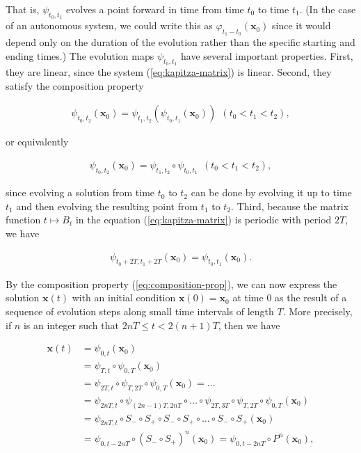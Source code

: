 \documentclass[11pt]{report}
\theoremstyle{plain}
\theoremstyle{definition}
\begin{document}
That is, $\psi_{t_0,t_1}$ evolves a point forward in
time from time $t_0$ to time $t_1$. (In the case of
an autonomous system, we could write this as
$\varphi_{t_1-t_0}(\mathbf{x}_0)$ since it would
depend only on the duration of the evolution rather
than the specific starting and ending times.) The
evolution maps $\psi_{t_0,t_1}$ have several
important properties. First, they are linear, since
the system (\ref{eq:kapitza-matrix}) is linear. Second,
they satisfy the composition property

\begin{align*}
\psi_{t_0,t_2}(\mathbf{x}_0) = \psi_{t_1,t_2}( \psi_{t_0,t_1}(\mathbf{x}_0)) \ \ (t_0<t_1<t_2),
\end{align*}

or equivalently

\begin{equation*} \tag{40}\label{eq:composition-prop}
\begin{split}
\psi_{t_0,t_2}(\mathbf{x}_0) = \psi_{t_1,t_2}\circ \psi_{t_0,t_1}\ \ (t_0<t_1<t_2),
\end{split}
\end{equation*}

since evolving a solution from time $t_0$ to $t_2$
can be done by evolving it up to time $t_1$ and then
evolving the resulting point from $t_1$ to $t_2$.
Third, because the matrix function $t\mapsto B_t$ in
the equation (\ref{eq:kapitza-matrix}) is periodic with
period $2T$, we have

\begin{align*}
\psi_{t_0+2T,t_1+2T}(\mathbf{x}_0) = \psi_{t_0,t_1}(\mathbf{x}_0).
\end{align*}

By the composition property (\ref{eq:composition-prop}),
we can now express the solution $\mathbf{x}(t)$ with
an initial condition $\mathbf{x}(0)=\mathbf{x}_0$ at
time $0$ as the result of a sequence of evolution
steps along small time intervals of length $T$. More
precisely, if $n$ is an integer such that
$2nT \le t < 2(n+1)T$, then we have

\begin{equation*} \tag{41}\label{eq:kapitza-phase-flow}
\begin{split}
\mathbf{x}(t) &= \psi_{0,t}(\mathbf{x}_0) \\
&=
\psi_{T,t} \circ \psi_{0,T}(\mathbf{x}_0) \\
&=
\psi_{2T,t} \circ \psi_{T,2T}\circ \psi_{0,T}(\mathbf{x}_0) =  \ldots \\
&=
\psi_{2nT, t} \circ \psi_{(2n-1)T,2nT} \circ \ldots
\circ \psi_{2T,3T} \circ \psi_{T,2T}\circ \psi_{0,T}(\mathbf{x}_0) \\
&=
\psi_{2nT, t} \circ S_- \circ S_+ \circ S_- \circ S_+ \circ \ldots \circ S_- \circ S_+ (\mathbf{x}_0) \\
&=
\psi_{0, t-2nT} \circ (S_- \circ S_+)^n (\mathbf{x}_0) = \psi_{0, t-2nT} \circ P^n (\mathbf{x}_0),
\end{split}
\end{equation*}
\end{document}
